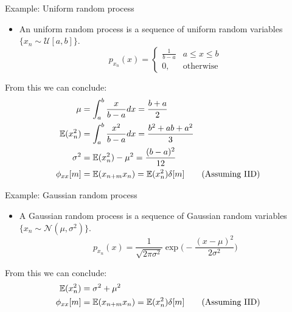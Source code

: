 \documentclass[10pt]{beamer}
\begin{document}
\begin{frame}{Example: Uniform random process}
	
	\begin{itemize}
		\item An uniform random process is a sequence of uniform random variables $\{x_n \sim \mathcal{U}[a, b]\}$.
		\begin{equation*}
		p_{x_n}(x) = \begin{cases}
		\displaystyle\frac{1}{b-a} & a\leq x\leq b \\
		0, &\text{otherwise}
		\end{cases}
		\end{equation*}
	\end{itemize}
	From this we can conclude:
	\begin{align*} 
	\mu &= \int_{a}^{b} \frac{x}{b-a}dx = \frac{b+a}{2} \\
	\operatorname{\mathbb{E}}(x_n^2) &= \int_{a}^{b} \frac{x^2}{b-a}dx = \frac{b^2+ab+a^2}{3} \\
	\sigma^2 &= \operatorname{\mathbb{E}}(x_n^2) - \mu^2 = \frac{(b-a)^2}{12} \\
	\phi_{xx}[m] &=\operatorname{\mathbb{E}}(x_{n+m}x_n) = \operatorname{\mathbb{E}}(x_n^2)\delta[m] \tag{Assuming IID}
	\end{align*}
\end{frame}

\begin{frame}{Example: Gaussian random process}
	
	\begin{itemize}
		\item A Gaussian random process is a sequence of Gaussian random variables $\{x_n \sim \mathcal{N}(\mu, \sigma^2)\}$.
		\begin{equation*}
		p_{x_n}(x) = \frac{1}{\sqrt{2\pi\sigma^2}}\exp\bigg(-\frac{(x-\mu)^2}{2\sigma^2}\bigg)
		\end{equation*}

	\end{itemize}
	From this we can conclude:
	\begin{align*} 
	\operatorname{\mathbb{E}}(x_n^2) &= \sigma^2 + \mu^2 \\
	\phi_{xx}[m] &=\operatorname{\mathbb{E}}(x_{n+m}x_n) = \operatorname{\mathbb{E}}(x_n^2)\delta[m] \tag{Assuming IID}
	\end{align*}	
\end{frame}

\end{document}
